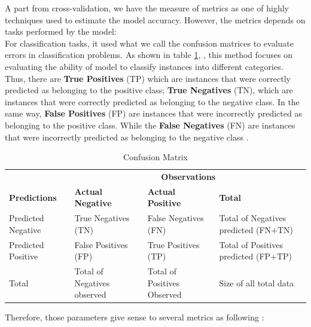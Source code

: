 \documentclass[12pt,a4paper]{report}
\begin{document}
A part from cross-validation, we have the measure of metrics as one of highly techniques used to estimate the model accuracy. However, the metrics depends on tasks performed by the model: 
\\

For classification tasks, it used what we call the confusion matrices to evaluate errors in classification problems.
As shown in table \ref{tab:confusionMatrixTable}, \cite{raschka2018model} , this method focuses on evaluating the ability of model to classify instances into different categories. Thus, there are \textbf{True Positives} (TP) which are instances that were correctly predicted as belonging to the positive class; \textbf{True Negatives} (TN), which are instances that were correctly predicted as belonging to the negative class. In the same way, \textbf{False Positives} (FP) are instances that were incorrectly predicted as belonging to the positive class. While the \textbf{False Negatives} (FN) are instances that were incorrectly predicted as belonging to the negative class \cite{maria2016performance}. 
\begin{table}[h]
	\centering
	\begin{tabular}{|p{3cm}|p{3.5cm}|p{3cm}|p{5cm}|} 
		\cline{2-4}
		\multicolumn{1}{c|}{}& \multicolumn{3}{c|}{\textbf{Observations}}   \\
		\cline{1-4} 
		\textbf{Predictions}	& \textbf{Actual Negative} & \textbf{Actual Positive} & \textbf{Total}\\
		\hline
		Predicted Negative & True Negatives (TN) & False Negatives (FN) & Total of Negatives predicted  (FN+TN)\\
		\hline
		Predicted Positive & False Positives (FP) & True Positives (TP) & Total of Positives predicted  (FP+TP)\\
		\hline
		Total & Total of Negatives observed & Total of Positives Observed & Size of all total data\\
		\hline
	\end{tabular} 
	\caption{Confusion Matrix}
	\label{tab:confusionMatrixTable}
\end{table}

Therefore, those parameters give sense to several metrics as following : 
\end{document}

